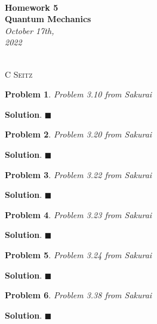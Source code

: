 \documentclass[12pt]{article}
\newtheorem{p}{Problem}
\theoremstyle{definition}
\newenvironment{s}{%
        \begin{trivlist} \item \textbf{Solution}. }{%
            \hspace*{\fill} $\blacksquare$\end{trivlist}}%
\begin{document}
 {\noindent\Huge\bf  \\[0.5\baselineskip] {\selectfont  Homework 5}         }\\[2\baselineskip] %
{ {\bf {}\selectfont Quantum Mechanics}\\ {\textit{\selectfont     October 17th, 2022}}}~~~~~~~~~~~~~~~~~~~~~~~~~~~~~~~~~~~~~~~~~~~~~~~~~~~~~~~~~~~~~~~~~~~~~~~~~~~~~    {\large \textsc{C Seitz}
\\[1.4\baselineskip] 

\begin{p}
Problem 3.10 from Sakurai
\end{p}

\begin{s}
\end{s}

\begin{p}
Problem 3.20 from Sakurai
\end{p}

\begin{s}
\end{s}

\begin{p}
Problem 3.22 from Sakurai
\end{p}

\begin{s}
\end{s}

\begin{p}
Problem 3.23 from Sakurai
\end{p}

\begin{s}
\end{s}

\begin{p}
Problem 3.24 from Sakurai
\end{p}

\begin{s}
\end{s}

\begin{p}
Problem 3.38 from Sakurai
\end{p}

\begin{s}
\end{s}
\end{document}
